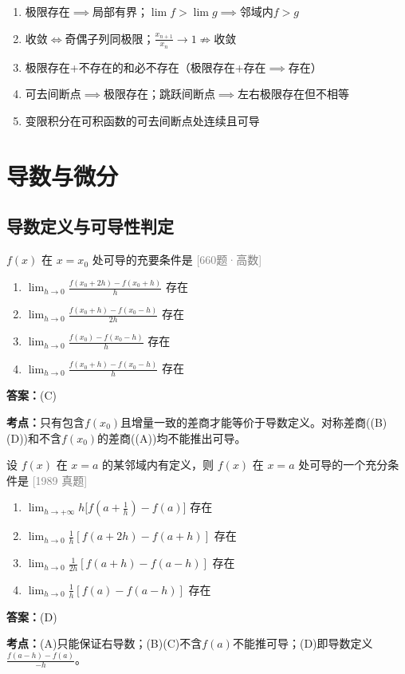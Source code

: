 \documentclass[12pt,a4paper]{ctexbook}
\newcommand{\src}[1]{\hfill\textcolor{gray}{\small\textsf{[#1]}}}
\newcommand{\ans}[1]{\begin{answerbox}\textbf{答案：}#1\end{answerbox}}
\newcommand{\kpt}[1]{\textbf{考点：}#1}
\begin{document}
\begin{tcolorbox}[colback=blue!5, colframe=blue!30, title=\textbf{极限与连续·核心结论}]
\begin{enumerate}[nosep]
  \item 极限存在$\implies$局部有界；$\lim f > \lim g \implies$邻域内$f>g$
  \item 收敛$\iff$奇偶子列同极限；$\frac{x_{n+1}}{x_n}\to 1\not\Rightarrow$收敛
  \item 极限存在+不存在的和必不存在（极限存在+存在$\implies$存在）
  \item 可去间断点$\implies$极限存在；跳跃间断点$\implies$左右极限存在但不相等
  \item 变限积分在可积函数的可去间断点处连续且可导
\end{enumerate}
\end{tcolorbox}

\newpage

\chapter{导数与微分}

\section{导数定义与可导性判定}

\begin{exercise}[660题·可导的充要条件]
$f(x)$ 在 $x=x_0$ 处可导的充要条件是 \hfill\src{660题·高数}
\begin{enumerate}[label=(\Alph*),nosep]
  \item $\lim_{h\to 0}\frac{f(x_0+2h)-f(x_0+h)}{h}$ 存在
  \item $\lim_{h\to 0}\frac{f(x_0+h)-f(x_0-h)}{2h}$ 存在
  \item $\lim_{h\to 0}\frac{f(x_0)-f(x_0-h)}{h}$ 存在
  \item $\lim_{h\to 0}\frac{f(x_0+h)-f(x_0-h)}{h}$ 存在
\end{enumerate}
\end{exercise}
\ans{(C)}
\kpt{只有包含$f(x_0)$且增量一致的差商才能等价于导数定义。对称差商((B)(D))和不含$f(x_0)$的差商((A))均不能推出可导。}

\bigskip

\begin{exercise}[1989 数学二·真题]
设 $f(x)$ 在 $x=a$ 的某邻域内有定义，则 $f(x)$ 在 $x=a$ 处可导的一个充分条件是 \hfill\src{1989 真题}
\begin{enumerate}[label=(\Alph*),nosep]
  \item $\lim_{h\to +\infty}h\bigl[f(a+\frac{1}{h})-f(a)\bigr]$ 存在
  \item $\lim_{h\to 0}\frac{1}{h}[f(a+2h)-f(a+h)]$ 存在
  \item $\lim_{h\to 0}\frac{1}{2h}[f(a+h)-f(a-h)]$ 存在
  \item $\lim_{h\to 0}\frac{1}{h}[f(a)-f(a-h)]$ 存在
\end{enumerate}
\end{exercise}
\ans{(D)}
\kpt{(A)只能保证右导数；(B)(C)不含$f(a)$不能推可导；(D)即导数定义$\frac{f(a-h)-f(a)}{-h}$。}
\end{document}
